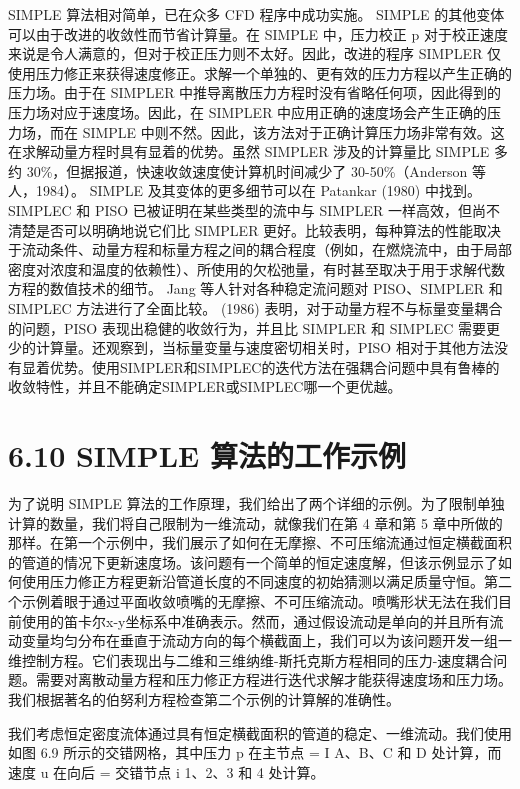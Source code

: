 \documentclass[11pt,a4paper,openany,fontset=none]{ctexbook}
\begin{document}
SIMPLE 算法相对简单，已在众多 CFD 程序中成功实施。 SIMPLE 的其他变体可以由于改进的收敛性而节省计算量。在 SIMPLE 中，压力校正 p 对于校正速度来说是令人满意的，但对于校正压力则不太好。因此，改进的程序 SIMPLER 仅使用压力修正来获得速度修正。求解一个单独的、更有效的压力方程以产生正确的压力场。由于在 SIMPLER 中推导离散压力方程时没有省略任何项，因此得到的压力场对应于速度场。因此，在 SIMPLER 中应用正确的速度场会产生正确的压力场，而在 SIMPLE 中则不然。因此，该方法对于正确计算压力场非常有效。这在求解动量方程时具有显着的优势。虽然 SIMPLER 涉及的计算量比 SIMPLE 多约 30\%，但据报道，快速收敛速度使计算机时间减少了 30-50\%（Anderson 等人，1984）。 SIMPLE 及其变体的更多细节可以在 Patankar (1980) 中找到。 SIMPLEC 和 PISO 已被证明在某些类型的流中与 SIMPLER 一样高效，但尚不清楚是否可以明确地说它们比 SIMPLER 更好。比较表明，每种算法的性能取决于流动条件、动量方程和标量方程之间的耦合程度（例如，在燃烧流中，由于局部密度对浓度和温度的依赖性）、所使用的欠松弛量，有时甚至取决于用于求解代数方程的数值技术的细节。 Jang 等人针对各种稳定流问题对 PISO、SIMPLER 和 SIMPLEC 方法进行了全面比较。 (1986) 表明，对于动量方程不与标量变量耦合的问题，PISO 表现出稳健的收敛行为，并且比 SIMPLER 和 SIMPLEC 需要更少的计算量。还观察到，当标量变量与速度密切相关时，PISO 相对于其他方法没有显着优势。使用SIMPLER和SIMPLEC的迭代方法在强耦合问题中具有鲁棒的收敛特性，并且不能确定SIMPLER或SIMPLEC哪一个更优越。

\section*{6.10 SIMPLE 算法的工作示例}

为了说明 SIMPLE 算法的工作原理，我们给出了两个详细的示例。为了限制单独计算的数量，我们将自己限制为一维流动，就像我们在第 4 章和第 5 章中所做的那样。在第一个示例中，我们展示了如何在无摩擦、不可压缩流通过恒定横截面积的管道的情况下更新速度场。该问题有一个简单的恒定速度解，但该示例显示了如何使用压力修正方程更新沿管道长度的不同速度的初始猜测以满足质量守恒。第二个示例着眼于通过平面收敛喷嘴的无摩擦、不可压缩流动。喷嘴形状无法在我们目前使用的笛卡尔x-y坐标系中准确表示。然而，通过假设流动是单向的并且所有流动变量均匀分布在垂直于流动方向的每个横截面上，我们可以为该问题开发一组一维控制方程。它们表现出与二维和三维纳维-斯托克斯方程相同的压力-速度耦合问题。需要对离散动量方程和压力修正方程进行迭代求解才能获得速度场和压力场。我们根据著名的伯努利方程检查第二个示例的计算解的准确性。

我们考虑恒定密度流体通过具有恒定横截面积的管道的稳定、一维流动。我们使用如图 6.9 所示的交错网格，其中压力 p 在主节点 = I A、B、C 和 D 处计算，而速度 u 在向后 = 交错节点 i 1、2、3 和 4 处计算。
\end{document}
